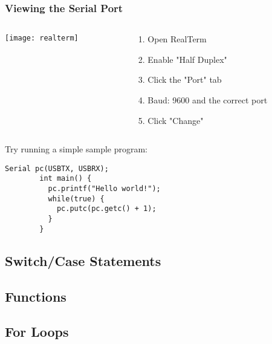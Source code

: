 \begin{frame}[fragile]
	\frametitle{Viewing the Serial Port}
	\begin{columns}[T]
		\begin{column}{0.5\textwidth}
			\texttt{[image: realterm]}
		\end{column}
		\begin{column}{0.5\textwidth}
			\begin{enumerate}
				\item Open RealTerm
				\item Enable "Half Duplex"
				\item Click the "Port" tab
				\item Baud: 9600 and the correct port
				\item Click "Change"
			\end{enumerate}
		\end{column}
	\end{columns}
	\vfill
	Try running a simple sample program:
	\begin{lstlisting}[numbers=none]
		Serial pc(USBTX, USBRX);
		int main() {
		  pc.printf("Hello world!");
		  while(true) {
		    pc.putc(pc.getc() + 1);
		  }
		}
	\end{lstlisting}
\end{frame}

\subsection{Switch/Case Statements}
\label{sub:switch_case}


\subsection{Functions}
\label{sub:functions}


\subsection{For Loops}
\label{sub:for_loops}
